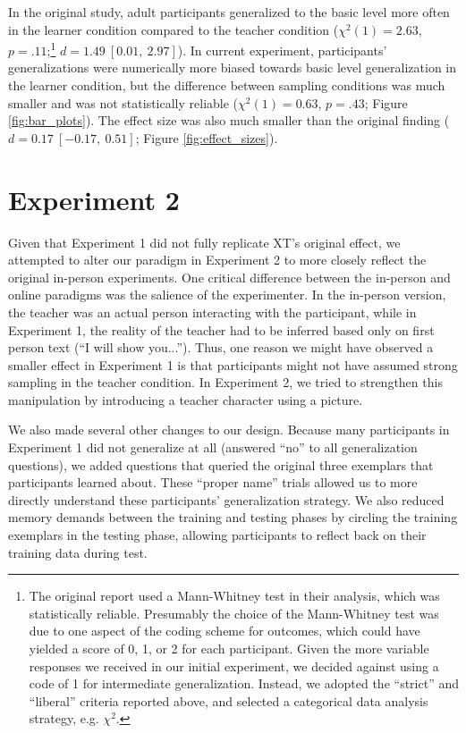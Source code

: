 \documentclass[man]{apa2}
\begin{document}
In the original study, adult participants generalized to the basic level more often in the learner condition compared to the teacher condition ($\chi^2(1) = 2.63$, $p = .11$;\footnote{The original report used a Mann-Whitney test in their analysis, which was statistically reliable. Presumably the choice of the Mann-Whitney test was due to one aspect of the coding scheme for outcomes, which could have yielded a score of 0, 1, or 2 for each participant. Given the more variable responses we received in our initial experiment, we decided against using a code of 1 for intermediate generalization. Instead, we adopted the ``strict'' and ``liberal'' criteria reported above, and selected a categorical data analysis strategy, e.g. $\chi^2$.} $d = 1.49\ [0.01,\ 2.97]$). In current experiment, participants' generalizations were numerically more biased towards basic level generalization in the learner condition, but the difference between sampling conditions was much smaller and was not statistically reliable ($\chi^2(1) = 0.63$, $p = .43$; Figure \ref{fig:bar_plots}). The effect size was also much smaller than the original finding ($d = 0.17\ [-0.17,\ 0.51]$; Figure \ref{fig:effect_sizes}).

\section{Experiment 2}

Given that Experiment 1 did not fully replicate XT's original effect, we attempted to alter our paradigm in Experiment 2 to more closely reflect the original in-person experiments. One critical difference between the in-person and online paradigms was the salience of the experimenter. In the in-person version, the teacher was an actual person interacting with the participant, while in Experiment 1, the reality of the teacher had to be inferred based only on first person text (``I will show you...''). Thus, one reason we might have observed a smaller effect in Experiment 1 is that participants might not have assumed strong sampling in the teacher condition. In Experiment 2, we tried to strengthen this manipulation by introducing a teacher character using a picture.

We also made several other changes to our design. Because many participants in Experiment 1 did not generalize at all (answered ``no'' to all generalization questions), we added questions that queried the original three exemplars that participants learned about. These ``proper name'' trials allowed us to more directly understand these participants' generalization strategy. We also reduced memory demands between the training and testing phases by circling the training exemplars in the testing phase, allowing participants to reflect back on their training data during test.
\end{document}
